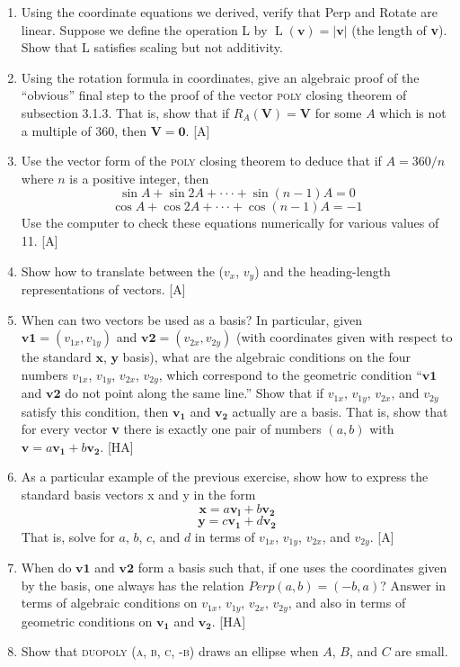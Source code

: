 \documentclass{book}
\begin{document}
\begin{enumerate}
\item Using the coordinate equations we derived, verify that Perp and
Rotate are linear. Suppose we define the operation L by $\operatorname{L}(\mathbf{v}) = |\mathbf{v}|$ (the
length of \textbf{v}). Show that L satisfies scaling but not additivity.
\item Using the rotation formula in coordinates, give an algebraic proof of
the ``obvious'' final step to the proof of the vector \textsc{poly} closing theorem
of subsection 3.1.3. That is, show that if $R_A(\mathbf{V}) = \mathbf{V}$ for some $A$ which
is not a multiple of 360, then $\mathbf{V} = \mathbf{0}$. [A]
\item Use the vector form of the \textsc{poly} closing theorem to deduce that if
$A = 360 / n$ where $n$ is a positive integer, then
$$\sin A + \sin 2A + \cdot \cdot \cdot + \sin (n - 1) A = 0$$
$$\cos A + \cos 2A + \cdot \cdot \cdot + \cos (n- 1) A =  -1$$
Use the computer to check these equations numerically for various values
of 11. [A]
\item Show how to translate between the ($v_x$, $v_y$) and the heading-length
representations of vectors. [A]
\item When can two vectors be used as a basis? In particular, given $\mathbf{v1} = (v_{1x}, v_{1y})$ 
and $\mathbf{v2} = (v_{2x}, v_{2y})$ (with coordinates given with respect to
the standard $\mathbf{x}$, $\mathbf{y}$ basis), what are the algebraic conditions on the four
numbers $v_{1x}$, $v_{1y}$, $v_{2x}$, $v_{2y}$, which correspond to the geometric condition
``$\mathbf{v1}$ and $\mathbf{v2}$ do not point along the same line.'' Show that if $v_{1x}$, $v_{1y}$, $v_{2x}$,
and $v_{2y}$ satisfy this condition, then $\mathbf{v_1}$ and $\mathbf{v_2}$ actually are a basis. That
is, show that for every vector \textbf{v} there is exactly one pair of numbers $(a, b)$
with  $\mathbf{v} = a\mathbf{v_1} + b\mathbf{v_2}$. [HA]
\item As a particular example of the previous exercise, show how to express
the standard basis vectors x and y in the form
$$\mathbf{x} = a\mathbf{v_l} + b\mathbf{v_2}$$
$$\mathbf{y} = c\mathbf{v_1} + d\mathbf{v_2}$$ That is, solve for $a$, $b$, $c$, and $d$ in terms of $v_{1x}$, $v_{1y}$, $v_{2x}$, and $v_{2y}$. [A]
\item When do $\mathbf{v1}$ and $\mathbf{v2}$ form a basis such that, if one uses the coordinates
given by the basis, one always has the relation $Perp(a, b) = (-b, a)$?
Answer in terms of algebraic conditions on $v_{1x}$, $v_{1y}$, $v_{2x}$, $v_{2y}$, and also
in terms of geometric conditions on $\mathbf{v_1}$ and $\mathbf{v_2}$. [HA]
\item Show that \textsc{duopoly (a, b, c, -b)} draws an ellipse when $A$, $B$, and
$C$ are small.  
\end{enumerate}
\end{document}
